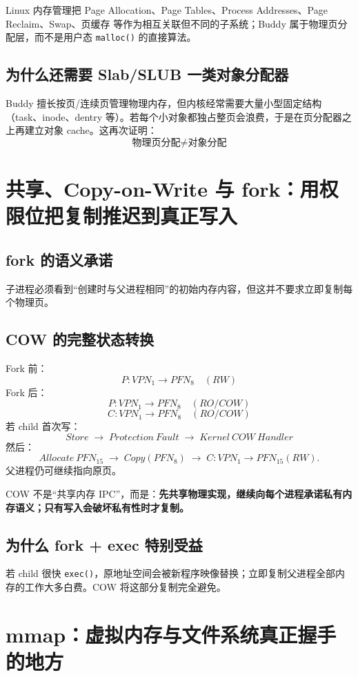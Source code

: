 \documentclass[11pt,a4paper]{ctexart}
\newcommand{\kw}[1]{\textbf{#1}}
\newcommand{\code}[1]{\texttt{#1}}
\newcommand{\arr}{\;\longrightarrow\;}
\begin{document}
\begin{eng}[工程定位]
Linux 内存管理把 Page Allocation、Page Tables、Process Addresses、Page Reclaim、Swap、页缓存 等作为相互关联但不同的子系统；Buddy 属于物理页分配层，而不是用户态 \code{malloc()} 的直接算法。
\end{eng}

\subsection{为什么还需要 Slab/SLUB 一类对象分配器}
Buddy 擅长按页/连续页管理物理内存，但内核经常需要大量小型固定结构（task、inode、dentry 等）。若每个小对象都独占整页会浪费，于是在页分配器之上再建立对象 cache。这再次证明：
\[
\boxed{\text{物理页分配} \neq \text{对象分配}}
\]

\section{共享、Copy-on-Write 与 fork：用权限位把复制推迟到真正写入}

\subsection{fork 的语义承诺}
子进程必须看到“创建时与父进程相同”的初始内存内容，但这并不要求立即复制每个物理页。

\subsection{COW 的完整状态转换}
Fork 前：
\[
P:VPN_1\to PFN_8\quad (RW)
\]
Fork 后：
\[
P:VPN_1\to PFN_8\quad (RO/COW)
\]
\[
C:VPN_1\to PFN_8\quad (RO/COW)
\]
若 child 首次写：
\[
Store\arr Protection\ Fault\arr Kernel\ COW\ Handler
\]
然后：
\[
Allocate\ PFN_{15}\arr Copy(PFN_8)\arr C:VPN_1\to PFN_{15}(RW).
\]
父进程仍可继续指向原页。

\begin{corebox}
COW 不是“共享内存 IPC”，而是：\kw{先共享物理实现，继续向每个进程承诺私有内存语义；只有写入会破坏私有性时才复制。}
\end{corebox}

\subsection{为什么 fork + exec 特别受益}
若 child 很快 \code{exec()}，原地址空间会被新程序映像替换；立即复制父进程全部内存的工作大多白费。COW 将这部分复制完全避免。

\section{mmap：虚拟内存与文件系统真正握手的地方}
\end{document}
